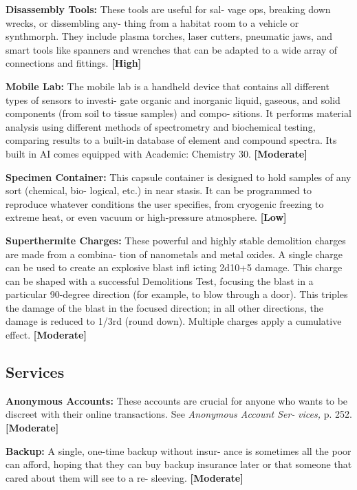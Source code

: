 \textbf{Disassembly Tools:} These tools are useful for sal-
vage ops, breaking down wrecks, or dissembling any-
thing from a habitat room to a vehicle or synthmorph. 
They include plasma torches, laser cutters, pneumatic 
jaws, and smart tools like spanners and wrenches that 
can be adapted to a wide array of connections and 
fittings. \textbf{[High]}

\textbf{Mobile Lab: }The mobile lab is a handheld device 
that contains all different types of sensors to investi-
gate organic and inorganic liquid, gaseous, and solid 
components (from soil to tissue samples) and compo-
sitions. It performs material analysis using different 
methods of spectrometry and biochemical testing, 
comparing results to a built-in database of element 
and compound spectra. Its built in AI comes equipped 
with Academic: Chemistry 30. \textbf{[Moderate]}

\textbf{Specimen Container:} This capsule container is 
designed to hold samples of any sort (chemical, bio-
logical, etc.) in near stasis. It can be programmed to 
reproduce whatever conditions the user specifies, from 
cryogenic freezing to extreme heat, or even vacuum or 
high-pressure atmosphere. \textbf{[Low]}

\textbf{Superthermite Charges:} These powerful and highly 
stable demolition charges are made from a combina-
tion of nanometals and metal oxides. A single charge 
can be used to create an explosive blast infl icting 
2d10+5 damage. This charge can be shaped with a 
successful Demolitions Test, focusing the blast in a 
particular 90-degree direction (for example, to blow 
through a door). This triples the damage of the blast 
in the focused direction; in all other directions, the 
damage is reduced to 1/3rd (round down). Multiple 
charges apply a cumulative effect. \textbf{[Moderate]}

\subsection{Services}

\textbf{Anonymous Accounts:} These accounts are crucial 
for anyone who wants to be discreet with their 
online transactions. See \textit{Anonymous Account Ser-}
\textit{vices,} p. 252. \textbf{[Moderate]}

\textbf{Backup:} A single, one-time backup without insur-
ance is sometimes all the poor can afford, hoping 
that they can buy backup insurance later or that 
someone that cared about them will see to a re-
sleeving. \textbf{[Moderate]}

